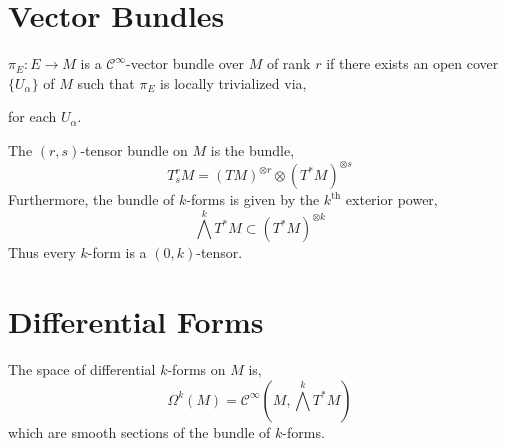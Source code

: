 \documentclass[12pt]{extarticle}
\newcommand{\R}{\mathbb{R}}
\theoremstyle{definition}
\newenvironment{definition}[1][Definition:]{\begin{trivlist}
\item[\hskip \labelsep {\bfseries #1}]}{\end{trivlist}}
\newcommand{\C}[1]{\mathcal{C}^{#1}}
\begin{document}
\section{Vector Bundles}

\begin{definition}
$\pi_E : E \to M$ is a $\C{\infty}$-vector bundle over $M$ of rank $r$ if there exists an open cover $\{ U_\alpha \}$ of $M$ such that $\pi_E$ is locally trivialized via,
\begin{center}
\end{center}
for each $U_\alpha$.
\end{definition}


\begin{definition}
The $(r,s)$-tensor bundle on $M$ is the bundle,
\[ T^r_s M = (T M)^{\otimes r} \otimes (T^* M)^{\otimes s} \]
Furthermore, the bundle of $k$-forms is given by the $k^{\mathrm{th}}$ exterior power,
\[  \bigwedge^k T^* M \subset (T^*M)^{\otimes k} \]
Thus every $k$-form is a $(0,k)$-tensor.  
\end{definition}

\section{Differential Forms}

\begin{definition}
The space of differential $k$-forms on $M$ is,
\[ \Omega^k(M) = \mathcal{C}^{\infty}\left(M, \bigwedge^k T^* M\right) \]
which are smooth sections of the bundle of $k$-forms. 
\end{definition}
\end{document}
